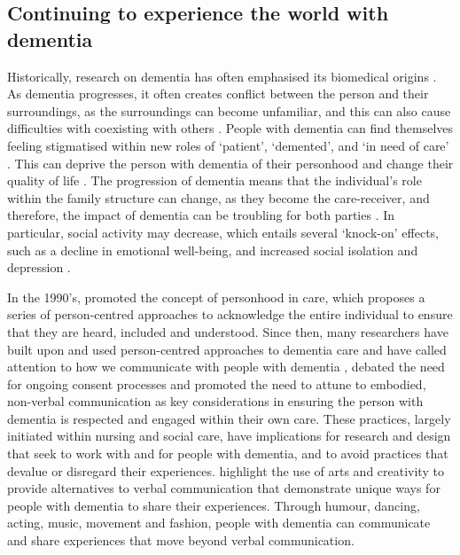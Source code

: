 \subsection{Continuing to experience the world with dementia}
\label{Context:Dementia}
Historically, research on dementia has often emphasised its biomedical origins \citep{lyman_bringing_1989}. As dementia progresses, it often creates conflict between the person and their surroundings, as the surroundings can become unfamiliar, and this can also cause difficulties with coexisting with others \citep{langdon_making_2007}. People with dementia can find themselves feeling stigmatised within new roles of `patient', `demented', and `in need of care' \citep{cohen-mansfield_utilization_2006}. This can deprive the person with dementia of their personhood and change their quality of life \citep{lawrence_improving_2012}. The progression of dementia means that the individual's role within the family structure can change, as they become the care-receiver, and therefore, the impact of dementia can be troubling for both parties \citep{dupuis_moving_2012}. In particular, social activity may decrease, which entails several `knock-on' effects, such as a decline in emotional well-being, and increased social isolation and depression \citep{bartlett_citizenship_2014}. 

In the 1990's, \cite{kitwood_towards_1992} promoted the concept of personhood in care, which proposes a series of person-centred approaches to acknowledge the entire individual to ensure that they are heard, included and understood. Since then, many researchers have built upon and used person-centred approaches to dementia care and have called attention to how we communicate with people with dementia \citep{oyebode_mental_2005}, debated the need for ongoing consent processes \citep{dewing_participatory_2007} and promoted the need to attune to embodied, non-verbal communication \citep{group_patron_2019, twigg_dress_2013} as key considerations in ensuring the person with dementia is respected and engaged within their own care. These practices, largely initiated within nursing and social care, have implications for research and design that seek to work with and for people with dementia, and to avoid practices that devalue or disregard their experiences. \cite{john_killick_claire_craig_creativity_2012} highlight the use of arts and creativity to provide alternatives to verbal communication that demonstrate unique ways for people with dementia to share their experiences. Through humour, dancing, acting, music, movement and fashion, people with dementia can communicate and share experiences that move beyond verbal communication.

